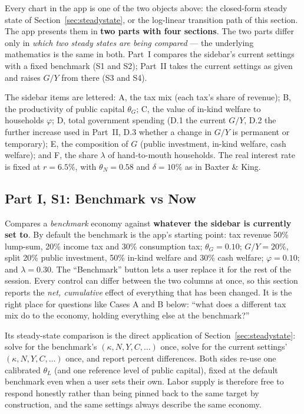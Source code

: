 \documentclass[11pt]{article}
\begin{document}
Every chart in the app is one of the two objects above: the closed-form
steady state of Section~\ref{sec:steadystate}, or the log-linear
transition path of this section. The app presents them in \textbf{two
parts with four sections}. The two parts differ only in \emph{which two
steady states are being compared} --- the underlying mathematics is the
same in both. Part~I compares the sidebar's current settings with a fixed
benchmark (S1 and S2); Part~II takes the current settings as given and
raises $G/Y$ from there (S3 and S4).

The sidebar items are lettered: A, the tax mix (each tax's share of
revenue); B, the productivity of public capital $\theta_G$; C, the value
of in-kind welfare to households $\varphi$; D, total government spending
(D.1 the current $G/Y$, D.2 the further increase used in Part~II, D.3
whether a change in $G/Y$ is permanent or temporary); E, the composition of
$G$ (public investment, in-kind welfare, cash welfare); and F, the share
$\lambda$ of hand-to-mouth households. The real interest rate is fixed at
$r=6.5\%$, with $\theta_N=0.58$ and $\delta=10\%$ as in Baxter \& King.

\subsection{Part I, S1: Benchmark vs Now}

Compares a \emph{benchmark} economy against \textbf{whatever the sidebar
is currently set to}. By default the benchmark is the app's starting
point: tax revenue 50\% lump-sum, 20\% income tax and 30\% consumption
tax; $\theta_G=0.10$; $G/Y=20\%$, split 20\% public investment, 50\%
in-kind welfare and 30\% cash welfare; $\varphi=0.10$; and $\lambda=0.30$.
The ``Benchmark'' button lets a user replace it for the rest of
the session. Every control can differ between the two columns at once, so
this section reports the \emph{net, cumulative} effect of everything that
has been changed. It is the right place for questions like Cases A and B
below: ``what does a different tax mix do to the economy, holding
everything else at the benchmark?''

Its steady-state comparison is the direct application of
Section~\ref{sec:steadystate}: solve for the benchmark's $(\kappa,N,Y,C,\ldots)$
once, solve for the current settings' $(\kappa,N,Y,C,\ldots)$ once, and
report percent differences. Both sides re-use one calibrated $\theta_L$
(and one reference level of public capital), fixed at the default
benchmark even when a user sets their own. Labor supply is therefore free
to respond honestly rather than being pinned back to the same target by
construction, and the same settings always describe the same economy.
\end{document}
